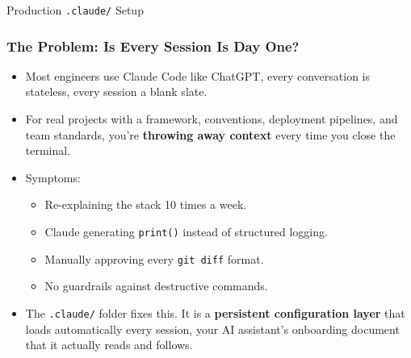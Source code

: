 






\begin{frame}[fragile]\frametitle{}
\begin{center}
{\Large Production \texttt{.claude/} Setup}
\end{center}
\end{frame}

\begin{frame}[fragile]\frametitle{The Problem: Is Every Session Is Day One?}
  \begin{itemize}
    \item Most engineers use Claude Code like ChatGPT, every conversation is stateless, every session a blank slate.
    \item For real projects with a framework, conventions, deployment pipelines, and team standards, you're \textbf{throwing away context} every time you close the terminal.
    \item Symptoms:
      \begin{itemize}
        \item Re-explaining the stack 10 times a week.
        \item Claude generating \texttt{print()} instead of structured logging.
        \item Manually approving every \texttt{git diff} format.
        \item No guardrails against destructive commands.
      \end{itemize}
    \item The \texttt{.claude/} folder fixes this. It is a \textbf{persistent configuration layer} that loads automatically every session, your AI assistant's onboarding document that it actually reads and follows.
  \end{itemize}
\end{frame}

